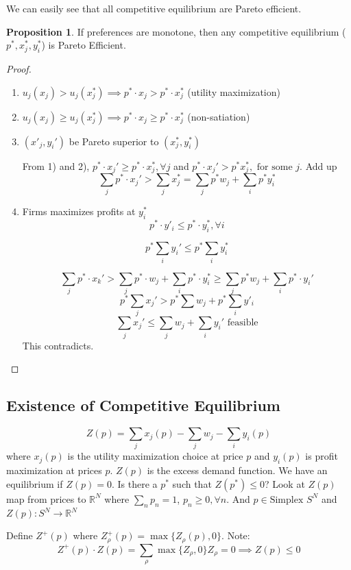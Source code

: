 \documentclass[11pt, a4paper, oneside]{article}
\theoremstyle{definition}
\newtheorem{myprop}{Proposition}
\theoremstyle{proposition}
\theoremstyle{corollary}
\theoremstyle{lemma}
\theoremstyle{theorem}
\begin{document}
We can easily see that all competitive equilibrium are Pareto efficient. 

\begin{myprop}
If preferences are monotone, then any competitive equilibrium ($p^*, x^*_j, y_i^*$) is Pareto Efficient. 
\end{myprop}

\begin{proof}
\begin{enumerate}
\item $u_j(x_j) > u_j(x_j^*)  \implies p^* \cdot x_j > p^*\cdot x_j^*$ (utility maximization)
\item $u_j(x_j) \geq u_j(x_j^*) \implies p^*\cdot x_j \geq p^*\cdot x_j^*$ (non-satiation)
\item $(x'_j, y_i')$ be Pareto superior to $(x_j^*, y_i^*)$

From 1) and 2), $p^*\cdot x_j' \geq p^*\cdot x_j^*, \forall j$ and $p^*\cdot x_j' > p^*x_j^*, \text{ for some } j$. Add up $$\sum_j p^*\cdot x_j' > \sum_j x^*_j = \sum_j p^* w_j + \sum_i p^*y_i^*$$
\item Firms maximizes profits at $y_i^*$ 
$$p^*\cdot y'_i \leq p^* \cdot y_i^*, \forall i$$

$$p^* \sum_i y_i' \leq p^*\sum_i y_i^*$$

$$\sum_j p^*\cdot x_k' > \sum_j p^*\cdot w_j + \sum_i p^*\cdot y_i^* \geq \sum_j p^* w_j + \sum_i p^* \cdot y_i'$$
$$p^* \sum_j x_j' > p^* \sum w_j + p^*\sum_i y'_i$$
$$\sum_j x_j' \leq \sum_j w_j + \sum_i y_i'\text{ feasible}$$
This contradicts. 
\end{enumerate}
\end{proof}

\subsection{Existence of Competitive Equilibrium}
$$Z(p) = \sum_j x_j(p) - \sum_j w_j - \sum_i y_i(p)$$
where $x_j(p)$ is the utility maximization choice at price $p$ and $y_i(p)$ is profit maximization at prices $p$. $Z(p)$ is the excess demand function. We have an equilibrium if $Z(p) = 0$. Is there a $p^*$ such that $Z(p^*) \leq 0$? Look at $Z(p)$ map from prices to $\mathbb{R}^N$ where $\sum_n p_{n}= 1$, $p_n\geq 0, \forall n$. And $p \in \text{Simplex }S^N$ and $Z(p): S^N \to \mathbb{R}^N$

Define $Z^+(p)$ where $Z^+_{\rho}(p) = \max\{Z_{\rho}(p), 0\}$. Note:
$$Z^+(p)\cdot Z(p) = \sum_{\rho}\max\{Z_{\rho}, 0\} Z_{\rho} = 0 \implies Z(p) \leq 0$$ 
\end{document}
